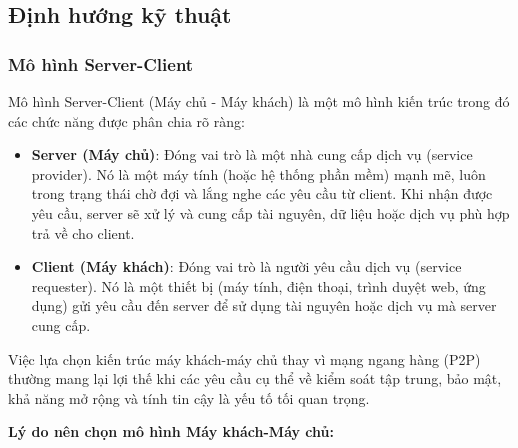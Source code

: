 \subsection{Định hướng kỹ thuật}
\subsubsection{Mô hình Server-Client}
Mô hình Server-Client (Máy chủ - Máy khách) là một mô hình kiến trúc trong đó các chức năng được phân chia rõ ràng:

\begin{itemize}
    \item \textbf{Server (Máy chủ)}: Đóng vai trò là một nhà cung cấp dịch vụ (service provider). Nó là một máy tính (hoặc hệ thống phần mềm) mạnh mẽ, luôn trong trạng thái chờ đợi và lắng nghe các yêu cầu từ client. Khi nhận được yêu cầu, server sẽ xử lý và cung cấp tài nguyên, dữ liệu hoặc dịch vụ phù hợp trả về cho client.
    \item \textbf{Client (Máy khách)}: Đóng vai trò là người yêu cầu dịch vụ (service requester). Nó là một thiết bị (máy tính, điện thoại, trình duyệt web, ứng dụng) gửi yêu cầu đến server để sử dụng tài nguyên hoặc dịch vụ mà server cung cấp.
\end{itemize}

\noindent Việc lựa chọn kiến trúc máy khách-máy chủ thay vì mạng ngang hàng (P2P) thường mang lại lợi thế khi các yêu cầu cụ thể về kiểm soát tập trung, bảo mật, khả năng mở rộng và tính tin cậy là yếu tố tối quan trọng.

\textbf{Lý do nên chọn mô hình Máy khách-Máy chủ:}

